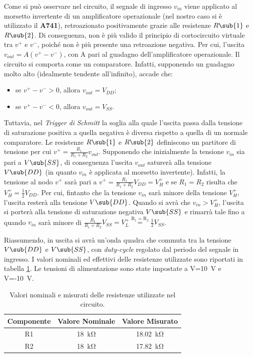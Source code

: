 \noindent
Come si può osservare nel circuito, il segnale di ingresso $v_{in}$ viene applicato al morsetto invertente di un amplificatore operazionale (nel nostro caso si è utilizzato il \textbf{\textmu A741}), retroazionato positivamente grazie alle resistenze $R\sub{1}$ e $R\sub{2}$. Di conseguenza, non è più valido il principio di cortocircuito virtuale tra $v^+$ e $v^-$, poiché non è più presente una retroazione negativa. Per cui, l'uscita $v_{out}=A(v^+-v^-)$, con A pari al guadagno dell'amplificatore operazionale. Il circuito si comporta come un comparatore. Infatti, supponendo un guadagno molto alto (idealmente tendente all'infinito), accade che:
\begin{itemize}
	\item se $v^+-v^->0$, allora $v_{out}=V_{DD}$;
	\item se $v^+-v^-<0$, allora $v_{out}=V_{SS}$.
\end{itemize}
Tuttavia, nel \textit{Trigger di Schmitt} la soglia alla quale l'uscita passa dalla tensione di saturazione positiva a quella negativa è diversa rispetto a quella di un normale comparatore. Le resistenze $R\sub{1}$ e $R\sub{2}$ definiscono un partitore di tensione per cui $v^+=\frac{R_1}{R_1+R_2}v_{out}$. Supponendo che inizialmente la tensione $v_{in}$ sia pari a $V\sub{SS}$, di conseguenza l'uscita $v_{out}$ saturerà alla tensione $V\sub{DD}$ (in quanto $v_{in}$ è applicata al morsetto invertente). Infatti, la tensione al nodo $v^+$ sarà pari a $v^+=\frac{R_1}{R_1+R_2}V_{DD}=V_H^+$ e se $R_1=R_2$ risulta che $V_H^+=\frac{1}{2}V_{DD}$. Per cui, fintanto che la tensione $v_{in}$ sarà minore della tensione $V_H^+$, l'uscita resterà alla tensione $V\sub{DD}$. Quando si avrà che $v_{in}>V_H^+$, l'uscita si porterà alla tensione di saturazione negativa $V\sub{SS}$ e rimarrà tale fino a quando $v_{in}$ sarà minore di $\frac{R_1}{R_1+R_2}V_{SS}=V_L^+\overset{\mathrm{R_1=R_2}}{=}\frac{1}{2}V_{SS}$. 

\noindent
Riassumendo, in uscita si avrà un'onda quadra che commuta tra la tensione $V\sub{DD}$ e $V\sub{SS}$, con \textit{duty-cycle} regolato dal periodo del segnale in ingresso. I valori nominali ed effettivi delle resistenze utilizzate sono riportati in tabella \ref{tab:valori_componenti_2}. Le tensioni di alimentazione sono state impostate a V=\SI{10}{\volt} e V=-\SI{10}{\volt}.

\def\arraystretch{1.3}
\begin{table}[h]
	\centering
	\begin{tabular}{|c|c|c|}
		\hline
		Componente	& Valore Nominale & Valore Misurato \\ \hline
		R1 &\SI{18}{\kilo\ohm} & \SI{18,02}{\kilo\ohm} \\ \hline
		R2 &\SI{18}{\kilo\ohm} & \SI{17,82}{\kilo\ohm} \\ \hline
	\end{tabular}
	\caption{Valori nominali e misurati delle resistenze utilizzate nel circuito.}
	\label{tab:valori_componenti_2}
\end{table}

